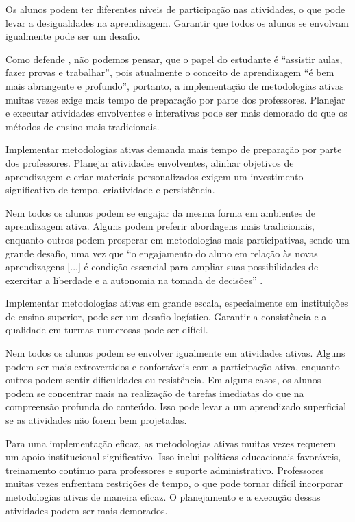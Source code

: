 Os alunos podem ter diferentes níveis de participação nas atividades, o que pode levar a desigualdades na aprendizagem. Garantir que todos os alunos se envolvam igualmente pode ser um desafio.

Como defende , não podemos pensar, que o papel do estudante é ``assistir aulas, fazer provas e trabalhar'', pois atualmente o conceito de aprendizagem ``é bem mais abrangente e profundo'', portanto, a implementação de metodologias ativas muitas vezes exige mais tempo de preparação por parte dos professores. Planejar e executar atividades envolventes e interativas pode ser mais demorado do que os métodos de ensino mais tradicionais.

Implementar metodologias ativas demanda mais tempo de preparação por parte dos professores. Planejar atividades envolventes, alinhar objetivos de aprendizagem e criar materiais personalizados exigem um investimento significativo de tempo, criatividade e persistência.

Nem todos os alunos podem se engajar da mesma forma em ambientes de aprendizagem ativa. Alguns podem preferir abordagens mais tradicionais, enquanto outros podem prosperar em metodologias mais participativas, sendo um grande desafio, uma vez que ``o engajamento do aluno em relação às novas aprendizagens [...] é condição essencial para ampliar suas possibilidades de exercitar a liberdade e a autonomia na tomada de decisões'' \cite[p. 28-29]{BERBEL2011}.

Implementar metodologias ativas em grande escala, especialmente em instituições de ensino superior, pode ser um desafio logístico. Garantir a consistência e a qualidade em turmas numerosas pode ser difícil.

Nem todos os alunos podem se envolver igualmente em atividades ativas. Alguns podem ser mais extrovertidos e confortáveis com a participação ativa, enquanto outros podem sentir dificuldades ou resistência. Em alguns casos, os alunos podem se concentrar mais na realização de tarefas imediatas do que na compreensão profunda do conteúdo. Isso pode levar a um aprendizado superficial se as atividades não forem bem projetadas.

Para uma implementação eficaz, as metodologias ativas muitas vezes requerem um apoio institucional significativo. Isso inclui políticas educacionais favoráveis, treinamento contínuo para professores e suporte administrativo. Professores muitas vezes enfrentam restrições de tempo, o que pode tornar difícil incorporar metodologias ativas de maneira eficaz. O planejamento e a execução dessas atividades podem ser mais demorados.

